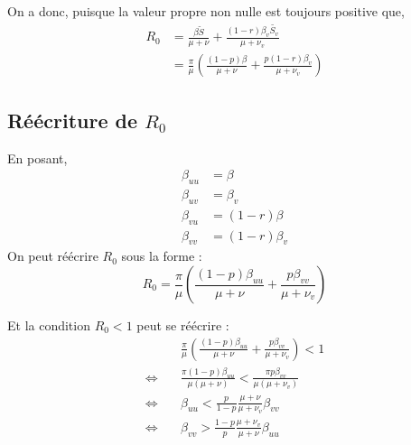 \documentclass[11pt]{article}
\newcommand{\ssi}{\Longleftrightarrow}
\begin{document}
On a donc, puisque la valeur propre non nulle est toujours positive que, 
\begin{align*}
R_0 &= \frac{\beta \tilde S}{\mu + \nu} + \frac{(1-r) \beta_v \tilde{S_v}}{\mu +\nu_v}\\
&= \frac{\pi}{\mu} \left(\frac{(1-p)\beta}{\mu + \nu} + \frac{p(1-r) \beta_v}{\mu +\nu_v}\right)
\end{align*}


\subsection{R\'e\'ecriture de $R_0$}
En posant, 
\begin{align*}
\beta_{uu} &= \beta\\
\beta_{uv} &= \beta_v\\
\beta_{vu} &= (1-r) \beta\\
\beta_{vv} &= (1-r) \beta_v 
\end{align*}
On peut r\'e\'ecrire $R_0$ sous la forme :
\[
R_0 = \frac{\pi}{\mu} \left(\frac{(1-p)\beta_{uu}}{\mu + \nu} + \frac{p \beta_{vv}}{\mu +\nu_v}\right)
\]

Et la condition $R_0 <1$ peut se r\'e\'ecrire :
\begin{align*}
	&\quad\frac{\pi}{\mu} \left(\frac{(1-p)\beta_{uu}}{\mu + \nu} + \frac{p \beta_{vv}}{\mu +\nu_v}\right)  < 1 \\
	\ssi&\quad  \frac{\pi(1-p)\beta_{uu}}{\mu(\mu+\nu)} < \frac{\pi p\beta_{vv}}{\mu(\mu+\nu_v)}\\
	\ssi&\quad\beta_{uu} < \frac{p}{1-p}\frac{\mu+\nu}{\mu+\nu_v}\beta_{vv}\\
	\ssi&\quad\beta_{vv} > \frac{1-p}{p}\frac{\mu+\nu_v}{\mu+\nu}\beta_{uu}
\end{align*}
\end{document}

